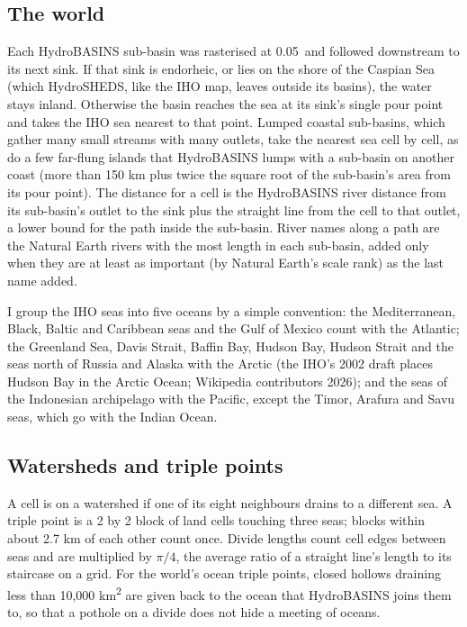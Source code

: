 \documentclass[11pt,a4paper]{article}
\begin{document}
\subsection{The world}

Each HydroBASINS sub-basin was rasterised at 0.05\textdegree\ and followed downstream to its next sink. If that sink is endorheic, or lies on the shore of the Caspian Sea (which HydroSHEDS, like the IHO map, leaves outside its basins), the water stays inland. Otherwise the basin reaches the sea at its sink's single pour point and takes the IHO sea nearest to that point. Lumped coastal sub-basins, which gather many small streams with many outlets, take the nearest sea cell by cell, as do a few far-flung islands that HydroBASINS lumps with a sub-basin on another coast (more than 150 km plus twice the square root of the sub-basin's area from its pour point). The distance for a cell is the HydroBASINS river distance from its sub-basin's outlet to the sink plus the straight line from the cell to that outlet, a lower bound for the path inside the sub-basin. River names along a path are the Natural Earth rivers with the most length in each sub-basin, added only when they are at least as important (by Natural Earth's scale rank) as the last name added.

I group the IHO seas into five oceans by a simple convention: the Mediterranean, Black, Baltic and Caribbean seas and the Gulf of Mexico count with the Atlantic; the Greenland Sea, Davis Strait, Baffin Bay, Hudson Bay, Hudson Strait and the seas north of Russia and Alaska with the Arctic (the IHO's 2002 draft places Hudson Bay in the Arctic Ocean; Wikipedia contributors 2026); and the seas of the Indonesian archipelago with the Pacific, except the Timor, Arafura and Savu seas, which go with the Indian Ocean.

\subsection{Watersheds and triple points}

A cell is on a watershed if one of its eight neighbours drains to a different sea. A triple point is a 2 by 2 block of land cells touching three seas; blocks within about 2.7 km of each other count once. Divide lengths count cell edges between seas and are multiplied by $\pi/4$, the average ratio of a straight line's length to its staircase on a grid. For the world's ocean triple points, closed hollows draining less than 10,000 km\textsuperscript{2} are given back to the ocean that HydroBASINS joins them to, so that a pothole on a divide does not hide a meeting of oceans.
\end{document}
